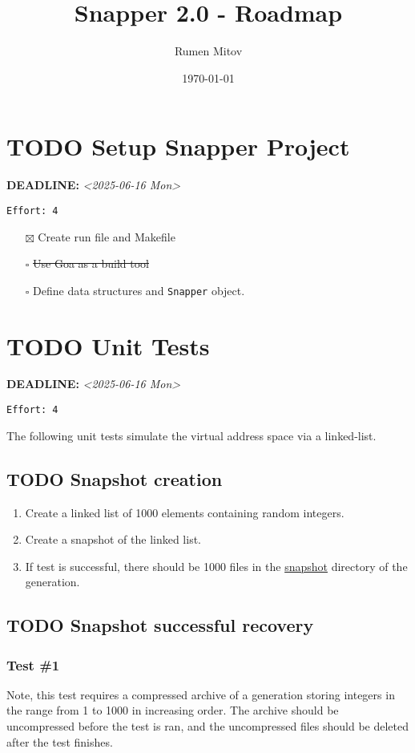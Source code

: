 \documentclass[11pt]{article}
\author{Rumen Mitov}
\date{\today}
\title{Snapper 2.0 - Roadmap}
\begin{document}
\maketitle
\section{{\bfseries\sffamily TODO}  Setup Snapper Project}
\label{sec:org02254b2}
\noindent\textbf{DEADLINE:} \textit{<2025-06-16 Mon>}\\
\begin{verbatim}
Effort: 4
\end{verbatim}
\begin{itemize}
\item[{$\boxtimes$}] Create run file and Makefile
\item[{$\square$}] \sout{Use Goa as a build tool}
\item[{$\square$}] Define data structures and \texttt{Snapper} object.
\end{itemize}
\section{{\bfseries\sffamily TODO}  Unit Tests}
\label{sec:orga2cb21b}
\noindent\textbf{DEADLINE:} \textit{<2025-06-16 Mon>}\\
\begin{verbatim}
Effort: 4
\end{verbatim}
The following unit tests simulate the virtual address space via a linked-list.
\subsection{{\bfseries\sffamily TODO} Snapshot creation}
\label{sec:org138ba3c}
\begin{enumerate}
\item Create a linked list of 1000 elements containing random integers.
\item Create a snapshot of the linked list.
\item If test is successful, there should be 1000 files in the \uline{snapshot} directory of the generation.
\end{enumerate}
\subsection{{\bfseries\sffamily TODO} Snapshot successful recovery}
\label{sec:org0a97a78}
\subsubsection{Test \#1}
\label{sec:org0a721d8}
Note, this test requires a compressed archive of a generation storing integers in the range from 1 to 1000 in increasing order. The archive should be uncompressed before the test is ran, and the uncompressed files should be deleted after the test finishes.
\end{document}
